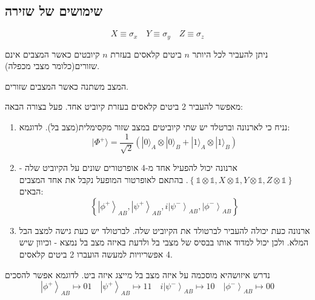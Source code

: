 \documentclass{tstextbook}
\begin{document}
\subsection{שימושים של שזירה}

\begin{symbolize}
$$X\equiv \sigma_{x}\quad Y\equiv \sigma_{y}\quad Z\equiv \sigma_{z}$$

\end{symbolize}
\begin{proposition}
ניתן להעביר לכל היותר \(n\) ביטים קלאסים בעזרת \(n\) קיובטים כאשר המצבים אינם שזורים(כלומר מצבי מכפלה).

\end{proposition}
המצב משתנה כאשר המצבים שזורים.

\begin{proposition}
מאפשר להעביר 2 ביטים קלאסים בעזרת קיוביט אחד. פעל בצורה הבאה:

  \begin{enumerate}
    \item נניח כי לארנונה וברטלד יש שתי קיוביטים במצב שזור מקסימלית(מצב בל). לדוגמא: 
$$|\Phi^{+}\rangle=\frac{1}{\sqrt{2}}(|0\rangle_{A}\otimes|0\rangle_{B}+|1\rangle_{A}\otimes|1\rangle_{B})$$


    \item ארנונה יכול להפעיל אחד מ-4 אופרטורים שונים על הקיוביט שלה - \(\left\{\mathbb{1}\otimes\mathbb{1},X\otimes\mathbb{1},Y\otimes\mathbb{1},Z\otimes\mathbb{1}\right\}\). בהתאם לאופרטור המופעל נקבל את אחד המצבים הבאים: 
$$\left\{\left|\phi^{+}\right\rangle_{A B},\left|\psi^{+}\right\rangle_{A B},i\left|\psi^{-}\right\rangle_{A B},\left|\phi^{-}\right\rangle_{A B}\right\}$$


    \item ארנונה כעת יכולה להעביר לברטולד את הקיוביט שלה. לברטולד יש כעת גישה למצב הבל המלא. ולכן יכול למדוד אותו בבסיס של מצבי בל ולדעת באיזה מצב בל נמצא - וכיוון שיש 4 אפשריויות למעשה הועברו 2 ביטים קלאסים. 


  \end{enumerate}
\end{proposition}
\begin{remark}
נדרש איזושהיא מוסכמה על איזה מצב בל מייצג איזה ביט. לדוגמא אפשר להסכים
$$\left|\phi^{+}\right\rangle_{A B}\mapsto 01\quad \left|\psi^{+}\right\rangle_{A B}\mapsto 11\quad i\left|\psi^{-}\right\rangle_{A B} \mapsto 10\quad \left|\phi^{-}\right\rangle_{A B}\mapsto 00$$

\end{remark}
\end{document}
